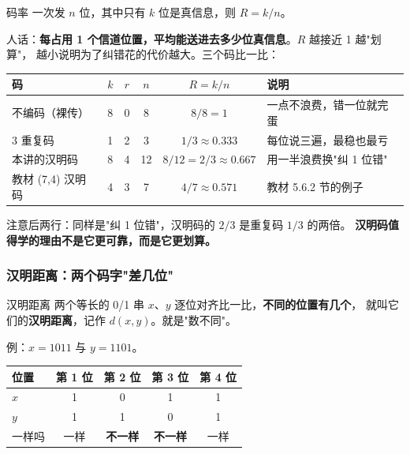 \begin{defbox}{码率}
一次发 $n$ 位，其中只有 $k$ 位是真信息，则 $R=k/n$。
\end{defbox}

人话：\textbf{每占用 1 个信道位置，平均能送进去多少位真信息}。$R$ 越接近 1 越"划算"，
越小说明为了纠错花的代价越大。三个码比一比：

\begin{center}\small
\setlength{\tabcolsep}{6pt}
\begin{tabular}{@{}lccccl@{}}
\toprule
码 & $k$ & $r$ & $n$ & $R=k/n$ & 说明\\
\midrule
不编码（裸传） & 8 & 0 & 8 & $8/8=1$ & 一点不浪费，错一位就完蛋\\
3 重复码 & 1 & 2 & 3 & $1/3\approx0.333$ & 每位说三遍，最稳也最亏\\
本讲的汉明码 & 8 & 4 & 12 & $8/12=2/3\approx0.667$ & 用一半浪费换"纠 1 位错"\\
教材 (7,4) 汉明码 & 4 & 3 & 7 & $4/7\approx0.571$ & 教材 5.6.2 节的例子\\
\bottomrule
\end{tabular}
\end{center}

注意后两行：同样是"纠 1 位错"，汉明码的 $2/3$ 是重复码 $1/3$ 的两倍。
\textbf{汉明码值得学的理由不是它更可靠，而是它更划算。}

\subsubsection{汉明距离：两个码字"差几位"}

\begin{defbox}{汉明距离}
两个等长的 0/1 串 $x$、$y$ 逐位对齐比一比，\textbf{不同的位置有几个}，
就叫它们的\textbf{汉明距离}，记作 $d(x,y)$。就是"数不同"。
\end{defbox}

例：$x=1011$ 与 $y=1101$。

\begin{center}\small
\setlength{\tabcolsep}{6pt}
\begin{tabular}{@{}lcccc@{}}
\toprule
位置 & 第 1 位 & 第 2 位 & 第 3 位 & 第 4 位\\
\midrule
$x$ & 1 & 0 & 1 & 1\\
$y$ & 1 & 1 & 0 & 1\\
一样吗 & 一样 & \textbf{不一样} & \textbf{不一样} & 一样\\
\bottomrule
\end{tabular}
\end{center}

